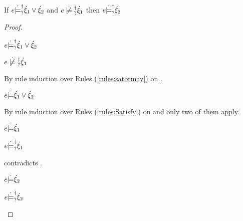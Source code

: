 \begin{lemma}
  \label{lem:satisfy-substraction}
  If $e \dot{\models}_{?}^{\dag} \dot{\xi}_1 \vee \dot{\xi}_2$ and $\cnotsatisfyormay{e}{\hxi_1}$ then $e \dot{\models}_{?}^{\dag} \dot{\xi}_2$
\end{lemma}
\begin{proof}
  \begin{pfsteps*}
  \item $e \dot{\models}_{?}^{\dag} \dot{\xi}_1 \vee \dot{\xi}_2$  
  \item $\cnotsatisfyormay{e}{\hxi_1}$  
  \end{pfsteps*}
  By rule induction over Rules (\ref{rules:satormay}) on .
  \begin{byCases}

  \item[\text{(\ref{rule:CSMSSat})}]
    \begin{pfsteps*}
    \item $e \dot{\models} \dot{\xi}_1 \vee \dot{\xi}_2$  
    \end{pfsteps*}
    By rule induction over Rules (\ref{rules:Satisfy}) on  and only two of them apply.
    \begin{byCases}

    \item[\text{(\ref{rule:CSOr1})}]
      \begin{pfsteps*}
      \item $e \dot{\models} \dot{\xi}_1$  
      \item $e \dot{\models}_{?}^{\dag} \dot{\xi}_1$  
      \end{pfsteps*}
       contradicts .

    \item[\text{(\ref{rule:CSOr2})}]
      \begin{pfsteps*}
      \item $e \dot{\models} \dot{\xi}_2$  
      \item $e \dot{\models}_{?}^{\dag} \dot{\xi}_2$ 
      \end{pfsteps*}
    \end{byCases}


\end{byCases}
\end{proof}
